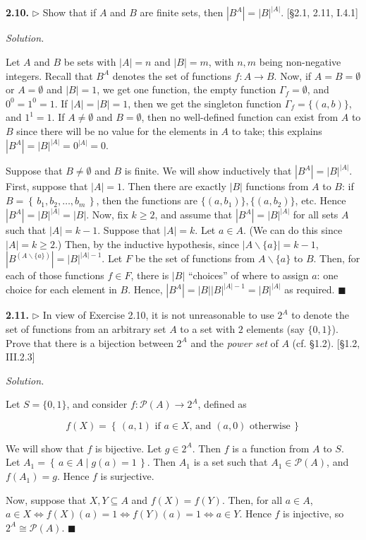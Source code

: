 \documentclass[14pt,parskip=full]{scrartcl}
\newcommand{\exercise}[3]{
\noindent
\textbf{#1.} #2

\noindent
\textit{Solution.}{\let\tpar\par \let\par\relax #3}
}
\newcommand{\set}[1]{\left\{\,#1\,\right\}}
\newcommand*{\QEDA}{\hfill\ensuremath{\blacksquare}}
\newcommand\abs[1]{\left|#1\right|}
\begin{document}
\exercise
{2.10}{$\rhd$ Show that if $A$ and $B$ are finite sets, then $\abs{B^A} =
\abs{B}^{\abs{A}}$. [\S2.1, 2.11, I.4.1]}{

Let $A$ and $B$ be sets with $\abs{A}=n$ and $\abs{B}=m$, with $n,m$ being
non-negative integers. Recall that $B^A$ denotes the set of functions $f:A\to
B$. Now, if $A=B=\emptyset$ or $A=\emptyset$ and $\abs{B}=1$, we get one
function, the empty function $\Gamma_f = \emptyset$, and $0^0 = 1^0 = 1$. If
$\abs{A} = \abs{B} = 1$, then we get the singleton function
$\Gamma_f=\{(a,b)\}$, and $1^1 = 1$. If $A\neq\emptyset$ and $B=\emptyset$, then
no well-defined function can exist from $A$ to $B$ since there will be no value
for the elements in $A$ to take; this explains $\abs{B^A} = \abs{B}^{\abs{A}} =
0^{\abs{A}} = 0$.

\tpar
Suppose that $B\neq\emptyset$ and $B$ is finite. We will show inductively that
$\abs{B^A} = \abs{B}^{\abs{A}}$. First, suppose that $\abs{A} = 1$.  Then there
are exactly $\abs{B}$ functions from $A$ to $B$: if $B=\set{b_1,b_2,\dots,b_m}$,
then the functions are $\{(a,b_1)\}, \{(a,b_2)\}$, etc. Hence $\abs{B^A} =
\abs{B}^{\abs{A}} = \abs{B}$.  Now, fix $k\geq 2$, and assume that $\abs{B^A} =
\abs{B}^{\abs{A}}$ for all sets $A$ such that $\abs{A}=k-1$. Suppose that
$\abs{A}=k$. Let $a\in A$. (We can do this since $\abs{A}=k\geq 2$.) Then, by
the inductive hypothesis, since $\abs{A\backslash\{a\}}=k-1$,
$\abs{B^{(A\backslash\{a\})}} = \abs{B}^{\abs{A}-1}$. Let $F$ be the set of
functions from $A\backslash\{a\}$ to $B$.  Then, for each of those functions
$f\in F$, there is $\abs{B}$ ``choices'' of where to assign $a$: one choice for
each element in $B$. Hence, $\abs{B^A} = \abs{B}\abs{B}^{\abs{A}-1} =
\abs{B}^{\abs{A}}$ as required.
\QEDA

}

\exercise
{2.11}{$\rhd$ In view of Exercise 2.10, it is not unreasonable to use $2^A$ to denote
the set of functions from an arbitrary set $A$ to a set with $2$ elements (say
$\{0,1\}$). Prove that there is a bijection between $2^A$ and the \textit{power
set} of $A$ (cf. \S1.2). [\S1.2, III.2.3]}{

Let $S = \{0,1\}$, and consider $f:\mathcal{P}(A)\to 2^A$, defined as

\[ f(X) = \set{(a,1) \text{ if $a\in X$, and }(a,0) \text{ otherwise}} \]

We will show that $f$ is bijective. Let $g\in 2^A$. Then $f$ is a
function from $A$ to $S$. Let $A_1 = \set{a\in A\mid g(a) = 1}$. Then $A_1$ is a
set such that $A_1\in\mathcal{P}(A)$, and $f(A_1)=g$. Hence $f$ is surjective.

Now, suppose that $X,Y\subseteq A$ and $f(X) = f(Y)$. Then, for all $a\in A$,
$a\in X \iff f(X)(a) = 1 \iff f(Y)(a) = 1 \iff a\in Y$. Hence $f$ is injective,
so $2^A\cong\mathcal{P}(A)$.
\QEDA

}
\end{document}
